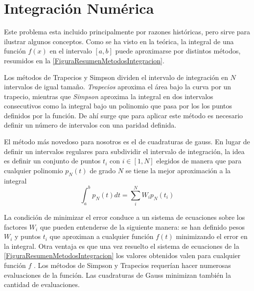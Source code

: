 \section{Integración Numérica}


Este problema esta incluido principalmente por razones históricas, 
pero sirve para ilustrar algunos conceptos. Como se ha visto en
la teórica, la integral de una función $f(x)$ en el intervalo 
$[a, b]$ puede aproximarse por distintos métodos, resumidos en la
\autoref{FiguraResumenMetodosIntegracion}. 

Los métodos de Trapecios y Simpson dividen el intervalo de integración 
en $N$ intervalos de igual tamaño. \emph{Trapecios} aproxima el 
área bajo la curva por un trapecio, mientras que \emph{Simpson}
aproxima la integral en dos intervalos consecutivos como la 
integral bajo un polinomio que pasa por los los puntos 
definidos por la función. De ahí surge que para aplicar
este método es necesario definir un número de intervalos con
una paridad definida. 

El método más novedoso para nosotros es el de cuadraturas de gauss.
En lugar de definir un intervalos regulares para subdividir el 
intervalo de integración, la idea es definir un conjunto de puntos
$t_i$ con $i \in [ 1 , N ]$ elegidos de manera que para cualquier 
polinomio $p_N (t)$ de grado $N$  se tiene la mejor aproximación a 
la integral 
\begin{equation}
 \int_a^b  p_N(t) dt = \sum_i^N W_i p_N (t_i) 
\end{equation}

\begin{figure}
  
  \caption{\protect\label{FiguraResumenMetodosIntegracion}}

\end{figure}

La condición de minimizar el error conduce a un sistema de ecuaciones sobre los 
factores $ W_i $ que pueden entenderse de la siguiente manera: se han definido 
pesos $W_i$ y puntos $t_i$ que aproximan a cualquier función $f(t)$ minimizando
el error en la integral. Otra ventaja es que una vez resuelto el sistema de 
ecuaciones de la \autoref{FiguraResumenMetodosIntegracion} los 
valores obtenidos valen para cualquier función $f$ . Los 
métodos de Simpson y Trapecios requerían hacer numerosas evaluaciones de la
función. Las cuadraturas de Gauss minimizan también la cantidad de evaluaciones. 

